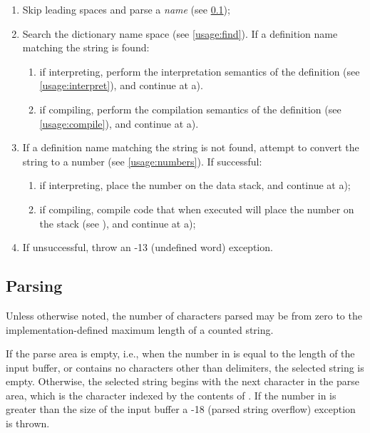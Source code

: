 \begin{enumerate}
\item Skip leading spaces and parse a \emph{name}
	(see \ref{usage:parsing});

\item Search the dictionary name space (see \ref{usage:find}).
	If a definition name matching the string is found:

	\begin{enumerate}
	\item if interpreting, perform the interpretation semantics of
		the definition (see \ref{usage:interpret}), and continue at
		a).

	\item if compiling, perform the compilation semantics of the
		definition (see \ref{usage:compile}), and continue at a).
	\end{enumerate}

\item If a definition name matching the string is not found,
	attempt to convert the string to a number
	(see \ref{usage:numbers}). If successful:

	\begin{enumerate}
	\item if interpreting, place the number on the data stack,
		and continue at a);

	\item if compiling, compile code that when executed will place
		the number on the stack (see ),
		and continue at a);
	\end{enumerate}

\item If unsuccessful, throw an -13 (undefined word) exception.
\end{enumerate}

\subsection{Parsing} %
\label{usage:parsing}

Unless otherwise noted, the number of characters parsed may be from
zero to the implementation-defined maximum length of a counted
string.

If the parse area is empty, i.e., when the number in  is
equal to the length of the input buffer, or contains no characters
other than delimiters, the selected string is empty. Otherwise, the
selected string begins with the next character in the parse area,
which is the character indexed by the contents of .
If the number in  is greater than the size of the input
buffer a -18 (parsed string overflow) exception is thrown.

